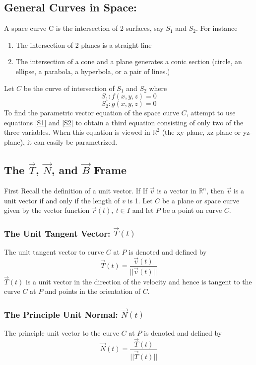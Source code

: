 \documentclass[14pt]{article}
\begin{document}
    \subsection{General Curves in Space:}
    A space curve C is the intersection of 2 surfaces, say $S_1$ and
    $S_2$. For instance
    \begin{enumerate}
        \item The intersection of 2 planes is a straight line
        \item The intersection of a cone and a plane generates a conic
        section (circle, an ellipse, a parabola, a hyperbola, or a pair
        of lines.)
    \end{enumerate}
    Let $C$ be the curve of intersection of $S_1$ and $S_2$ where
    \begin{equation}\label{S1}
        S_1:f(x,y,z)=0
    \end{equation}
    \begin{equation}\label{S2}
        S_2:g(x,y,z)=0
    \end{equation}
    To find the parametric vector equation of the space curve $C$,
    attempt to use equations \eqref{S1} and \eqref{S2} to obtain a third
    equation consisting of only two of the three variables. When this
    equation is viewed in $\mathbb{R}^2$ (the xy-plane, xz-plane or
    yz-plane), it can easily be parametrized.
    \subsection{The $\vec T$, $\vec N$, and $\vec B$ Frame}
    First Recall the definition of a unit vector. If If $\vec v$ is a
    vector in $\mathbb{R}^n$, then $\vec v$ is a unit vector if and only
    if the length of $v$ is 1. Let $C$ be a plane or space curve given
    by the vector function $\vec r(t),\ t\in I$ and let $P$ be a point
    on curve $C$.
    \subsubsection{The Unit Tangent Vector: $\vec T(t)$}
    The unit tangent vector to curve $C$ at $P$ is denoted and defined
    by
    $$\vec T(t)=\frac{\vec v(t)}{||\vec v (t)||}$$ $\vec T(t)$ is a unit
    vector in the direction of the velocity and hence is tangent to the
    curve $C$ at $P$ and points in the orientation of $C$.
    \subsubsection{The Principle Unit Normal: $\vec N(t)$}
    The principle unit vector to the curve $C$ at $P$ is denoted and
    defined by
    $$\vec N(t)=\frac{\vec T(t)}{||\vec T(t)||}$$
\end{document}
